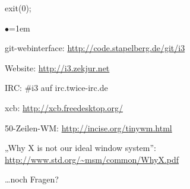 \documentclass[mode=print,paper=screen,style=jefka]{powerdot}
\begin{document}
\begin{slide}{exit(0);}
\begin{list}{$\bullet$}{\itemsep=1em}
        \item git-webinterface: \url{http://code.stapelberg.de/git/i3}
        \item Website: \url{http://i3.zekjur.net}
        \item IRC: \#i3 auf irc.twice-irc.de
        \item xcb: \url{http://xcb.freedesktop.org/}
        \item 50-Zeilen-WM: \url{http://incise.org/tinywm.html}
        \item „Why X is not our ideal window system”: \url{http://www.std.org/~msm/common/WhyX.pdf}
        \item …noch Fragen?
\end{list}
\end{slide}
\end{document}
